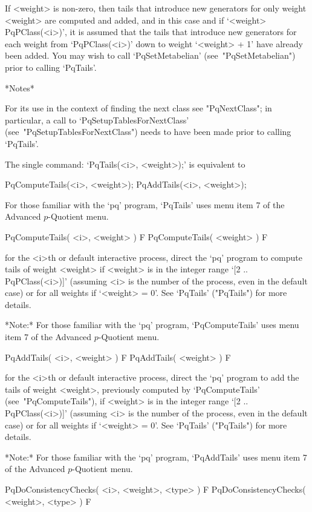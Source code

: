 If <weight> is non-zero, then tails that  introduce  new  generators  for
only weight <weight> are computed and added, and  in  this  case  and  if
`<weight> \< PqPClass(<i>)', it is assumed that the tails that  introduce
new generators for  each  weight  from  `PqPClass(<i>)'  down  to  weight
`<weight>  +  1'  have  already  been  added.  You  may  wish   to   call
`PqSetMetabelian' (see~"PqSetMetabelian") prior to calling `PqTails'.

*Notes*

For its use in the context of finding the next class  see  "PqNextClass";
in     particular,     a     call     to      `PqSetupTablesForNextClass'
(see~"PqSetupTablesForNextClass")  needs  to  have  been  made  prior  to
calling `PqTails'.

The single command: `PqTails(<i>, <weight>);' is equivalent to

PqComputeTails(<i>, <weight>);
PqAddTails(<i>, <weight>);

For those familiar with the `pq' program, `PqTails' uses menu  item  7  of
the Advanced $p$-Quotient menu.

\>PqComputeTails( <i>, <weight> ) F
\>PqComputeTails( <weight> ) F

for the <i>th or default interactive {\ANUPQ} process,  direct  the  `pq'
program to compute tails of weight <weight> if <weight> is in the  integer
range `[2 .. PqPClass(<i>)]' (assuming <i> is the number of the  process,
even in the default case) or for all  weights  if  `<weight>  =  0'.  See
`PqTails' ("PqTails") for more details.

*Note:*
For those familiar with the `pq' program, `PqComputeTails' uses menu  item
7 of the Advanced $p$-Quotient menu.

\>PqAddTails( <i>, <weight> ) F
\>PqAddTails( <weight> ) F

for the <i>th or default interactive {\ANUPQ} process,  direct  the  `pq'
program to add the  tails  of  weight  <weight>,  previously  computed  by
`PqComputeTails' (see~"PqComputeTails"), if <weight> is  in  the  integer
range `[2 .. PqPClass(<i>)]' (assuming <i> is the number of the  process,
even in the default case) or for all  weights  if  `<weight>  =  0'.  See
`PqTails' ("PqTails") for more details.

*Note:*
For those familiar with the `pq' program, `PqAddTails' uses menu item 7 of
the Advanced $p$-Quotient menu.

\>PqDoConsistencyChecks( <i>, <weight>, <type> ) F
\>PqDoConsistencyChecks( <weight>, <type> ) F

